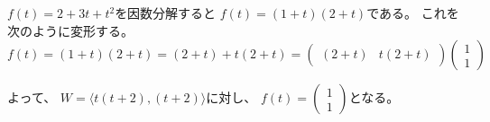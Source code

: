 \documentclass[12pt,b5paper]{ltjsarticle}
\begin{document}
\begin{enumerate}
      \dotfill

      $f(t)=2+3t+t^2$を因数分解すると
      $f(t)=(1+t)(2+t)$である。
      これを次のように変形する。
      \begin{equation}
       f(t)=(1+t)(2+t)=(2+t)+t(2+t)
        =\begin{pmatrix}(2+t) & t(2+t)\end{pmatrix}
        \begin{pmatrix}1 \\ 1\end{pmatrix}
      \end{equation}

      よって、
      $W=\langle t(t+2),(t+2)\rangle$に対し、
      $f(t)=\begin{pmatrix}1 \\ 1\end{pmatrix}$となる。

      \hrulefill
\end{enumerate}
\end{document}
